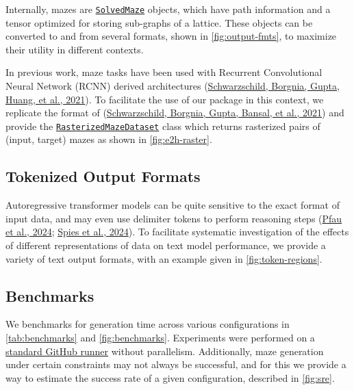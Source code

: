 \documentclass[10pt,a4paper,onecolumn]{article}
\begin{document}
Internally, mazes are
\href{https://understanding-search.github.io/maze-dataset/maze_dataset.html\#SolvedMaze}{\texttt{SolvedMaze}}
objects, which have path information and a tensor optimized for storing
sub-graphs of a lattice. These objects can be converted to and from
several formats, shown in \autoref{fig:output-fmts}, to maximize their
utility in different contexts.

In previous work, maze tasks have been used with Recurrent Convolutional
Neural Network (RCNN) derived architectures
(\protect\hyperlink{ref-deepthinking}{Schwarzschild, Borgnia, Gupta,
Huang, et al., 2021}). To facilitate the use of our package in this
context, we replicate the format of
(\protect\hyperlink{ref-easy_to_hard}{Schwarzschild, Borgnia, Gupta,
Bansal, et al., 2021}) and provide the
\href{https://understanding-search.github.io/maze-dataset/maze_dataset/dataset/rasterized.html\#RasterizedMazeDataset}{\texttt{RasterizedMazeDataset}}
class which returns rasterized pairs of (input, target) mazes as shown
in \autoref{fig:e2h-raster}.





\newpage

\hypertarget{sec:tokenized-output-formats}{%
\subsection{Tokenized Output
Formats}\label{sec:tokenized-output-formats}}

Autoregressive transformer models can be quite sensitive to the exact
format of input data, and may even use delimiter tokens to perform
reasoning steps (\protect\hyperlink{ref-pfau2024dotbydot}{Pfau et al.,
2024}; \protect\hyperlink{ref-spies2024causalworldmodels}{Spies et al.,
2024}). To facilitate systematic investigation of the effects of
different representations of data on text model performance, we provide
a variety of text output formats, with an example given in
\autoref{fig:token-regions}.



\hypertarget{benchmarks}{%
\subsection{Benchmarks}\label{benchmarks}}

We benchmarks for generation time across various configurations in
\autoref{tab:benchmarks} and \autoref{fig:benchmarks}. Experiments were
performed on a
\href{https://docs.github.com/en/actions/using-github-hosted-runners/using-github-hosted-runners/about-github-hosted-runners\#standard-github-hosted-runners-for-public-repositories}{standard
GitHub runner} without parallelism. Additionally, maze generation under
certain constraints may not always be successful, and for this we
provide a way to estimate the success rate of a given configuration,
described in \autoref{fig:sre}.
\end{document}
